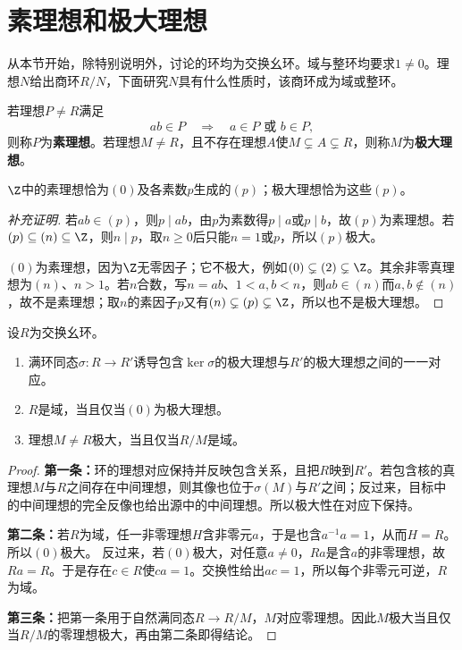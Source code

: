 \section{素理想和极大理想}

从本节开始，除特别说明外，讨论的环均为交换幺环。域与整环均要求$1\ne0$。理想$N$给出商环$R/N$，下面研究$N$具有什么性质时，该商环成为域或整环。

\begin{definition}
若理想$P\ne R$满足
\[
ab\in P\quad\Longrightarrow\quad a\in P\text{ 或 }b\in P,
\]
则称$P$为\textbf{素理想}。若理想$M\ne R$，且不存在理想$A$使$M\subsetneq A\subsetneq R$，则称$M$为\textbf{极大理想}。
\end{definition}

\begin{example}
$\Z$中的素理想恰为$(0)$及各素数$p$生成的$(p)$；极大理想恰为这些$(p)$。
\end{example}
\begin{proof}[补充证明]
若$ab\in(p)$，则$p\mid ab$，由$p$为素数得$p\mid a$或$p\mid b$，故$(p)$为素理想。若$(p)\subseteq(n)\subseteq\Z$，则$n\mid p$，取$n\geq0$后只能$n=1$或$p$，所以$(p)$极大。

$(0)$为素理想，因为$\Z$无零因子；它不极大，例如$(0)\subsetneq(2)\subsetneq\Z$。其余非零真理想为$(n)$、$n>1$。若$n$合数，写$n=ab$、$1<a,b<n$，则$ab\in(n)$而$a,b\notin(n)$，故不是素理想；取$n$的素因子$p$又有$(n)\subsetneq(p)\subsetneq\Z$，所以也不是极大理想。
\end{proof}

\begin{theorem}\label{p2:prime-maximal}
设$R$为交换幺环。
\begin{enumerate}
\item 满环同态$\sigma:R\to R'$诱导包含$\ker\sigma$的极大理想与$R'$的极大理想之间的一一对应。
\item $R$是域，当且仅当$(0)$为极大理想。
\item 理想$M\ne R$极大，当且仅当$R/M$是域。
\end{enumerate}
\end{theorem}
\begin{proof}
\textbf{第一条：}环的理想对应保持并反映包含关系，且把$R$映到$R'$。若包含核的真理想$M$与$R$之间存在中间理想，则其像也位于$\sigma(M)$与$R'$之间；反过来，目标中的中间理想的完全反像也给出源中的中间理想。所以极大性在对应下保持。

\textbf{第二条：}若$R$为域，任一非零理想$H$含非零元$a$，于是也含$a^{-1}a=1$，从而$H=R$。所以$(0)$极大。
反过来，若$(0)$极大，对任意$a\ne0$，$Ra$是含$a$的非零理想，故$Ra=R$。于是存在$c\in R$使$ca=1$。交换性给出$ac=1$，所以每个非零元可逆，$R$为域。

\textbf{第三条：}把第一条用于自然满同态$R\to R/M$，$M$对应零理想。因此$M$极大当且仅当$R/M$的零理想极大，再由第二条即得结论。
\end{proof}

